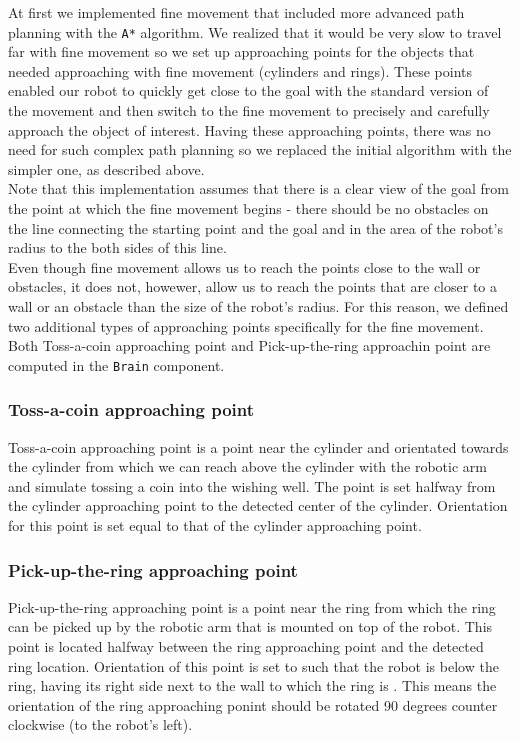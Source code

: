 \documentclass[12pt,a4paper]{article}
\begin{document}
	At first we implemented fine movement that included more advanced path planning with the \texttt{A*} algorithm. We realized that it would be very slow to travel far with fine movement so we set up approaching points for the objects that needed approaching with fine movement (cylinders and rings). These points enabled our robot to quickly get close to the goal with the standard version of the movement and then switch to the fine movement to precisely and carefully approach the object of interest. Having these approaching points, there was no need for such complex path planning so we replaced the initial algorithm with the simpler one, as described above. \\
	
	Note that this implementation assumes that there is a clear view of the goal from the point at which the fine movement begins - there should be no obstacles on the line connecting the starting point and the goal and in the area of the robot's radius to the both sides of this line. \\

	Even though fine movement allows us to reach the points close to the wall or obstacles, it does not, howewer, allow us to reach the points that are closer to a wall or an obstacle than the size of the robot's radius. For this reason, we defined two additional types of approaching points specifically for the fine movement. Both Toss-a-coin approaching point and Pick-up-the-ring approachin point are computed in the \texttt{Brain} component. \\

	\subsubsection{Toss-a-coin approaching point} \label{toss-a-coin-point}
	Toss-a-coin approaching point is a point near the cylinder and orientated towards the cylinder from which we can reach above the cylinder with the robotic arm and simulate tossing a coin into the wishing well. The point is set halfway from the cylinder approaching point to the detected center of the cylinder. Orientation for this point is set equal to that of the cylinder approaching point. \\

	\subsubsection{Pick-up-the-ring approaching point} \label{pick-up-the-ring-point}
	Pick-up-the-ring approaching point is a point near the ring from which the ring can be picked up by the robotic arm that is mounted on top of the robot. This point is located halfway between the ring approaching point and the detected ring location. Orientation of this point is set to such that the robot is below the ring, having its right side next to the wall to which the ring is . This means the orientation of the ring approaching ponint should be rotated 90 degrees counter clockwise (to the robot's left). \\
	
\end{document}
